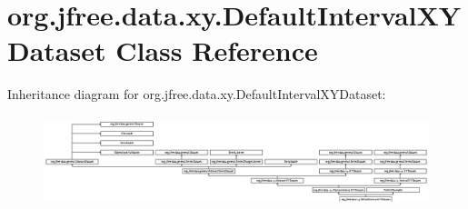 \hypertarget{classorg_1_1jfree_1_1data_1_1xy_1_1_default_interval_x_y_dataset}{}\section{org.\+jfree.\+data.\+xy.\+Default\+Interval\+X\+Y\+Dataset Class Reference}
\label{classorg_1_1jfree_1_1data_1_1xy_1_1_default_interval_x_y_dataset}
Inheritance diagram for org.\+jfree.\+data.\+xy.\+Default\+Interval\+X\+Y\+Dataset\+:\begin{figure}[H]
\begin{center}
\leavevmode
\includegraphics[height=2.637362cm]{classorg_1_1jfree_1_1data_1_1xy_1_1_default_interval_x_y_dataset}
\end{center}
\end{figure}
